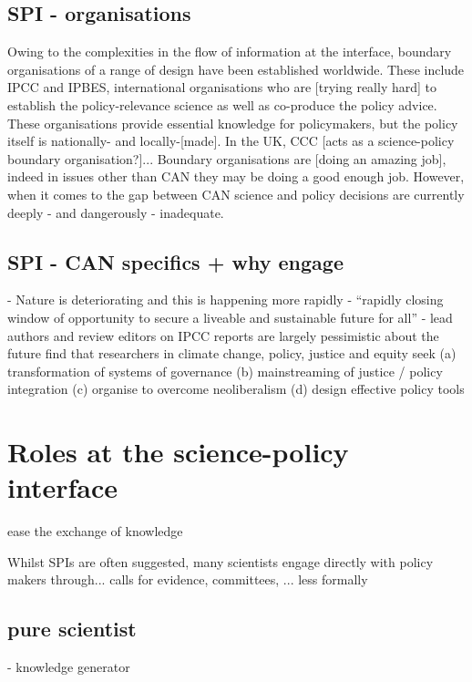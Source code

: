 \subsection{SPI - organisations}
Owing to the complexities in the flow of information at the interface, boundary organisations of a range of design have been established worldwide. These include IPCC and IPBES, international organisations who are [trying really hard] to establish the policy-relevance science as well as co-produce the policy advice. These organisations provide essential knowledge for policymakers, but the policy itself is nationally- and locally-[made]. In the UK, CCC [acts as a science-policy boundary organisation?]... Boundary organisations are [doing an amazing job], indeed in issues other than CAN they may be doing a good enough job. However, when it comes to the gap between CAN science and policy decisions are currently deeply - and dangerously - inadequate. 

\subsection{SPI - CAN specifics + why engage}
\cite{IPBES2022} - Nature is deteriorating and this is happening more rapidly
\cite{IIPCC2022} - ``rapidly closing window of opportunity to secure a liveable and sustainable future for all''
\cite{Carrington2024} - lead authors and review editors on IPCC reports are largely pessimistic about the future
\cite{CairneyTS2023} find that researchers in climate change, policy, justice and equity seek (a) transformation of systems of governance (b) mainstreaming of justice / policy integration (c) organise to overcome neoliberalism (d) design effective policy tools

\section{Roles at the science-policy interface}\label{sec:litroles}
ease the exchange of knowledge

Whilst SPIs are often suggested, many scientists engage directly with policy makers through... calls for evidence, committees, ... less formally

\subsection{pure scientist}
\cite{BalvaneraJNOBCDGGKKMPSSW2020} - knowledge generator

